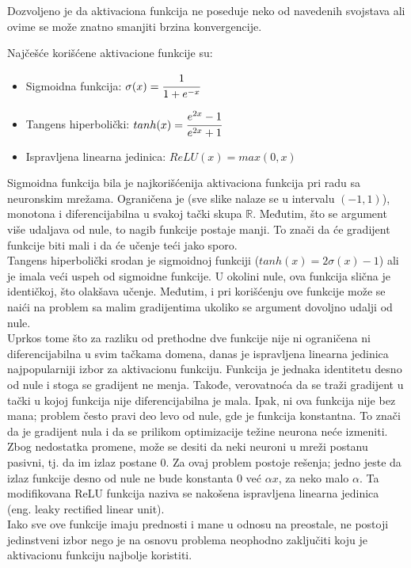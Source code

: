 Dozvoljeno je da aktivaciona funkcija ne poseduje neko od navedenih svojstava ali ovime se može znatno smanjiti brzina konvergencije. 
\par
Najčešće korišćene aktivacione funkcije su:
\begin{itemize}
	\item Sigmoidna funkcija: $\sigma (x) = \cfrac{1}{1+e^{-x}}$
	\item Tangens hiperbolički: $tanh(x) = \cfrac{e^{2x}-1}{e^{2x}+1}$
	\item Ispravljena linearna jedinica: $ReLU(x) = max(0, x)$
\end{itemize}

Sigmoidna funkcija bila je najkorišćenija aktivaciona funkcija pri radu sa neuronskim mrežama. Ograničena je (sve slike nalaze se u intervalu $(-1, 1)$), monotona i diferencijabilna u svakoj tački skupa $\mathbb{R}$. Međutim, što se argument više udaljava od nule, to nagib funkcije postaje manji. To znači da će gradijent funkcije biti mali i da će učenje teći jako sporo. \\
Tangens hiperbolički srodan je sigmoidnoj funkciji ($tanh(x) = 2\sigma (x) - 1$) ali je imala veći uspeh od sigmoidne funkcije.  U okolini nule, ova funkcija slična je identičkoj, što olakšava učenje. Međutim, i pri korišćenju ove funkcije može se naići na problem sa malim gradijentima ukoliko se argument dovoljno udalji od nule.\\
Uprkos tome što za razliku od prethodne dve funkcije nije ni ograničena ni diferencijabilna u svim tačkama domena, danas je ispravljena linearna jedinica najpopularniji izbor za aktivacionu funkciju. Funkcija je jednaka identitetu desno od nule i stoga se gradijent ne menja. Takođe, verovatnoća da se traži gradijent u tački u kojoj funkcija nije diferencijabilna je mala. Ipak, ni ova funkcija nije bez mana; problem često pravi deo levo od nule, gde je funkcija konstantna. To znači da je gradijent nula i da se prilikom optimizacije težine neurona neće izmeniti. Zbog nedostatka promene, može se desiti da neki neuroni u mreži postanu pasivni, tj. da im izlaz postane $0$. Za ovaj problem postoje rešenja; jedno jeste da izlaz funkcije desno od nule ne bude konstanta $0$ već $\alpha x$, za neko malo $\alpha$. Ta modifikovana ReLU funkcija naziva se nakošena ispravljena linearna jedinica (eng. leaky rectified linear unit). 
\\
Iako sve ove funkcije imaju prednosti i mane u odnosu na preostale, ne postoji jedinstveni izbor nego je na osnovu problema neophodno zaključiti koju je aktivacionu funkciju najbolje koristiti.

